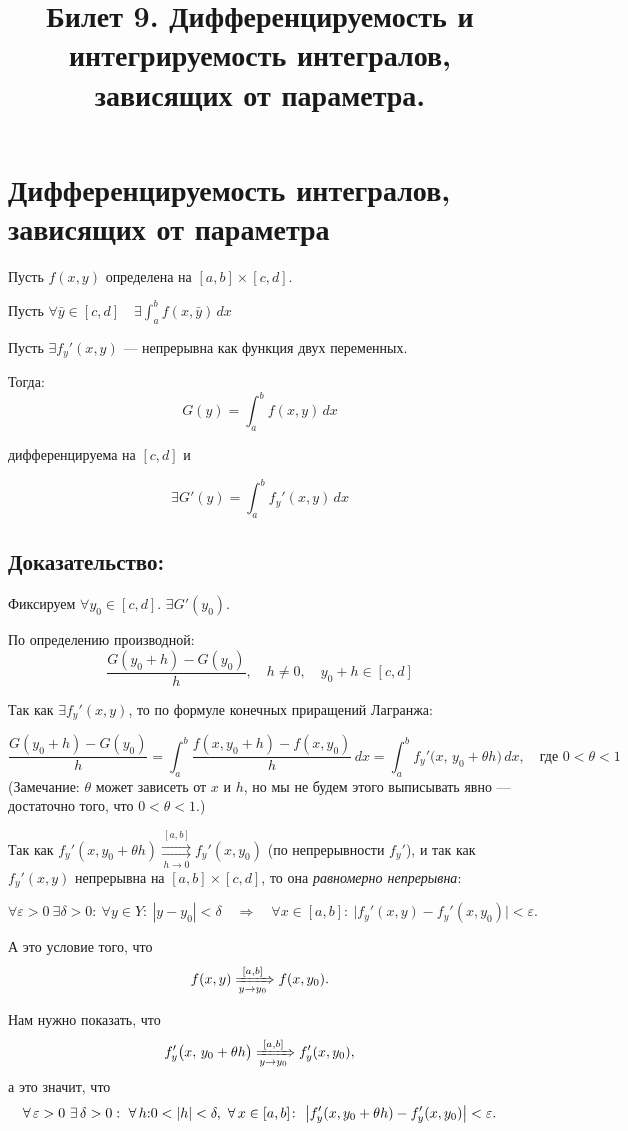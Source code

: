 \documentclass{article}
\title{ Билет 9. Дифференцируемость и интегрируемость интегралов, зависящих от параметра.}
\author{}
\date{}
\begin{document}
\maketitle

\section*{Дифференцируемость интегралов, зависящих от параметра}

Пусть $f(x,y)$ определена на $[a,b] \times [c,d]$.

Пусть $\forall \bar{y} \in [c,d] \quad \exists \int_a^b f(x,\bar{y})\,dx$

Пусть $\exists f_y'(x,y)$ — непрерывна как функция двух переменных.

Тогда:
\[
G(y) = \int_a^b f(x,y)\,dx
\]

дифференцируема на $[c,d]$ и

\[
\exists G'(y) = \int_a^b f_y'(x,y)\,dx
\]

\subsection*{Доказательство:}

Фиксируем $\forall y_0 \in [c,d]$. $\exists G'(y_0)$.

По определению производной:
\[
\frac{G(y_0 + h) - G(y_0)}{h}, \quad h \ne 0, \quad y_0 + h \in [c,d]
\]

Так как $\exists f_y'(x,y)$, то по формуле конечных приращений Лагранжа:

\[
\frac{G(y_0 + h) - G(y_0)}{h}
= \int_a^b \frac{f(x,y_0 + h) - f(x,y_0)}{h}\,dx 
= \int_a^b f_y'\bigl(x,\, y_0 + \theta h\bigr)\,dx,
\quad \text{где } 0 < \theta < 1
\]
(Замечание: $\theta$ может зависеть от $x$ и $h$, но мы не будем этого выписывать явно — достаточно того, что $0 < \theta < 1$.)

Так как \quad $f_y'(x, y_0 + \theta h) \mathop{\rightrightarrows}\limits^{[a, b]}_{\,h \to 0\,} f_y'(x, y_0)$ (по непрерывности $f_y'$),  
и так как $f_y'(x,y)$ непрерывна на $[a,b] \times [c,d]$, то она \textit{равномерно непрерывна}:

\[
\forall \varepsilon > 0\ \exists \delta > 0:\ 
\forall y \in Y:\ |y - y_0| < \delta \quad \Rightarrow \quad \forall x \in [a,b]:\ 
\bigl| f_y'(x, y) - f_y'(x, y_0) \bigr| < \varepsilon.
\]

А это условие того, что 
\[
f(x,y) \xRightarrow[y \to y_0]{[a,b]} f(x,y_0).
\]

Нам нужно показать, что 
\[
f_y'\bigl(x,\,y_0 + \theta h\bigr) \xRightarrow[y \to y_0]{[a,b]} f_y'(x, y_0),
\]
а это значит, что
\[
\forall\, \varepsilon > 0\ \exists\, \delta > 0:\ 
\forall\, h \text : 0 < |h| < \delta,\ 
\forall\, x \in [a,b]\colon\ 
\bigl| f_y'(x, y_0 + \theta h) - f_y'(x, y_0) \bigr| < \varepsilon.
\]
\end{document}

